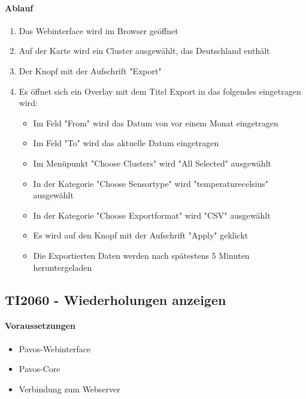 \paragraph{Ablauf}
\begin{enumerate}
\item Das Webinterface wird im Browser geöffnet
\item Auf der Karte wird ein Cluster ausgewählt, das Deutschland enthält
\item Der Knopf mit der Aufschrift "Export"
\item Es öffnet sich ein Overlay mit dem Titel Export in das folgendes eingetragen wird:
\begin{itemize}
\item Im Feld "From" wird das Datum von vor einem Monat eingetragen
\item Im Feld "To" wird das aktuelle Datum eingetragen
\item Im Menüpunkt  "Choose Clusters" wird "All Selected" ausgewählt
\item In der Kategorie "Choose Sensortype" wird "temperature\textunderscore celsius" ausgewählt
\item In der Kategorie "Choose Exportformat" wird "CSV" ausgewählt
\item Es wird auf den Knopf mit der Aufschrift "Apply" geklickt
\item Die Exportierten Daten werden nach spätestens 5 Minuten heruntergeladen
\end{itemize}
\end{enumerate}
\szenarioGood

\subsection{TI2060 - Wiederholungen anzeigen}
\paragraph{Voraussetzungen}
\begin{itemize}
\item Pavos-Webinterface
\item Pavos-Core
\item Verbindung zum Webserver
\end{itemize}
